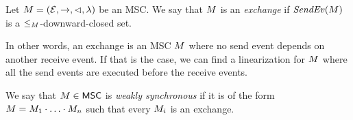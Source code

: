 \begin{definition}[exchange]\label{def:weak-synchr}
Let $M = (\mathcal{E},\to,\lhd,\lambda)$ be an MSC.
We say that $M$ is an \emph{exchange} if
$\mathit{SendEv}(M)$ is
a ${\le_M}$-downward-closed set.
\end{definition}

In other words, an exchange is an MSC $M$ where no send event depends on another receive event. If that is the case, we can find a linearization for $M$ where all the send events are executed before the receive events.

\begin{definition}\label{def:weaksync-new}
	We say that $M \in \mathsf{MSC}$ is
	\emph{weakly synchronous} if it is of the form
	$M = M_1 \cdot \ldots \cdot M_n$
	such that every $M_i$ is an exchange.
\end{definition}

